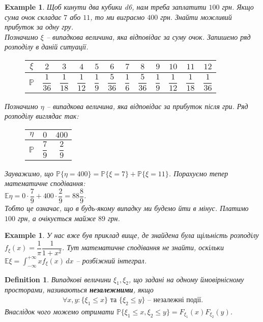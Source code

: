 \documentclass[a4paper, 10pt]{article}
\theoremstyle{theoremdd}
\newtheorem{definition}[theorem]{Definition}
\newtheorem{example}[theorem]{Example}
\begin{document}
\begin{example}
Щоб кинути два кубики d6, нам треба заплатити $100$ грн. Якщо сума очок складає $7$ або $11$, то ми виграємо $400$ грн. Знайти можливий прибуток за одну гру.\\
Позначимо $\xi$ -- випадкова величина, яка відповідає за суму очок. Запишемо ряд розподілу в даній ситуації.
\begin{figure}[H]
\centering
\begin{tabular}{c|c|c|c|c|c|c|c|c|c|c|c}
$\xi$ & $2$ & $3$ & $4$ & $5$ & $6$ & $7$ & $8$ & $9$ & $10$ & $11$ & $12$ \\
\hline
$\mathbb{P}$ & $\dfrac{1}{36}$ & $\dfrac{1}{18}$ & $\dfrac{1}{12}$ & $\dfrac{1}{9}$ & $\dfrac{5}{36}$ & $\dfrac{1}{6}$ & $\dfrac{5}{36}$ & $\dfrac{1}{9}$ & $\dfrac{1}{12}$ & $\dfrac{1}{18}$ & $\dfrac{1}{36}$
\end{tabular}
\end{figure}
\noindent Позначимо $\eta$ -- випадкова величина, яка відповідає за прибуток після гри. Ряд розподілу виглядає так:
\begin{figure}[H]
\centering
\begin{tabular}{c|c|c}
$\eta$ & $0$ & $400$ \\
\hline
$\mathbb{P}$ & $\dfrac{7}{9}$ & $\dfrac{2}{9}$ 
\end{tabular}
\end{figure}
\noindent Зауважимо, що $\mathbb{P}\{\eta = 400\} = \mathbb{P}\{\xi = 7\} + \mathbb{P}\{\xi = 11\}$. Порахуємо тепер математичне сподівання:\\
$\mathbb{E}\eta = 0 \cdot \dfrac{7}{9} + 400 \cdot \dfrac{2}{9} = 88 \dfrac{8}{9}$.\\
Тобто це означає, що в будь-якому випадку ми будемо йти в мінус. Платимо $100$ грн, а очікується майже $89$ грн.
\end{example}

\begin{example}
У нас вже був приклад вище, де знайдена була щільність розподілу $f_\xi(x) = \dfrac{1}{\pi} \dfrac{1}{1+x^2}$. Тут математичне сподівання не знайти, оскільки $\mathbb{E}\xi = \displaystyle\int_{-\infty}^{+\infty} x f_\xi(x)\,dx$ -- розбіжний інтеграл.
\end{example}

\begin{definition}
Випадкові величини $\xi_1,\xi_2$, що задані на одному ймовірнісному просторами, називаються \textbf{незалежними}, якщо
\begin{align*}
\forall x,y: \{\xi_1 \leq x\} \text{ та } \{\xi_2 \leq y \} \text{ -- незалежні події.}
\end{align*}
Внаслідок чого можемо отримати $\mathbb{P}\{\xi_1 \leq x, \xi_2 \leq y\} = F_{\xi_1}(x) F_{\xi_2}(y)$.
\end{definition}
\end{document}
